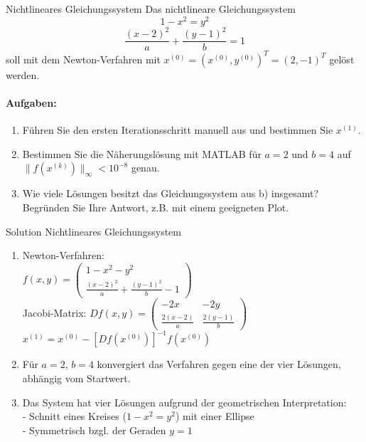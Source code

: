 \begin{example2}{Nichtlineares Gleichungssystem}
Das nichtlineare Gleichungssystem
$$1 - x^2 = y^2$$
$$\frac{(x-2)^2}{a} + \frac{(y-1)^2}{b} = 1$$
soll mit dem Newton-Verfahren mit $x^{(0)} = (x^{(0)}, y^{(0)})^T = (2,-1)^T$ gelöst werden.

\paragraph{Aufgaben:}
\begin{enumerate}
    \item Führen Sie den ersten Iterationsschritt manuell aus und bestimmen Sie $x^{(1)}$.
    
    \item Bestimmen Sie die Näherungslösung mit MATLAB für $a = 2$ und $b = 4$ auf $\|f(x^{(k)})\|_\infty < 10^{-8}$ genau.
    
    \item Wie viele Lösungen besitzt das Gleichungssystem aus b) insgesamt? Begründen Sie Ihre Antwort, z.B. mit einem geeigneten Plot.
\end{enumerate}
\end{example2}

\begin{KR}{Solution Nichtlineares Gleichungssystem}
\begin{enumerate}
    \item Newton-Verfahren:\\
    $f(x,y) = \begin{pmatrix} 1-x^2-y^2\\ \frac{(x-2)^2}{a} + \frac{(y-1)^2}{b} - 1 \end{pmatrix}$\\
    
    Jacobi-Matrix:
    $Df(x,y) = \begin{pmatrix} 
    -2x & -2y\\
    \frac{2(x-2)}{a} & \frac{2(y-1)}{b}
    \end{pmatrix}$\\
    
    $x^{(1)} = x^{(0)} - [Df(x^{(0)})]^{-1}f(x^{(0)})$
    
    \item Für $a=2$, $b=4$ konvergiert das Verfahren gegen eine der vier Lösungen, abhängig vom Startwert.
    
    \item Das System hat vier Lösungen aufgrund der geometrischen Interpretation:\\
    - Schnitt eines Kreises ($1-x^2=y^2$) mit einer Ellipse\\
    - Symmetrisch bzgl. der Geraden $y=1$
\end{enumerate}
\end{KR}

